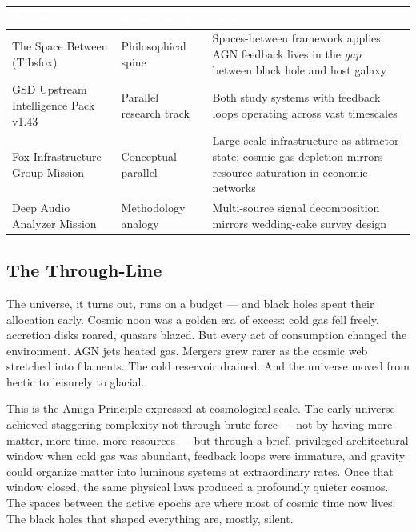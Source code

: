 \documentclass[11pt,letterpaper]{article}
\newcommand{\stageheader}[2]{%
  \noindent\colorbox{#2}{\makebox[\textwidth][l]{%
    \textcolor{white}{\bfseries\sffamily\hspace{6pt}#1\hspace{6pt}}}}%
  \vspace{0.5em}\par%
}
\newcommand{\tableheader}[1]{\textbf{\sffamily\textcolor{white}{#1}}}
\begin{document}
\begin{center}
\begin{tabularx}{\textwidth}{L{4cm}L{4cm}X}
\toprule
{}
\tableheader{Document} & \tableheader{Relationship} & \tableheader{Notes} \\
\midrule
The Space Between (Tibsfox) & Philosophical spine & Spaces-between framework applies: AGN feedback lives in the \emph{gap} between black hole and host galaxy \\
GSD Upstream Intelligence Pack v1.43 & Parallel research track & Both study systems with feedback loops operating across vast timescales \\
Fox Infrastructure Group Mission & Conceptual parallel & Large-scale infrastructure as attractor-state: cosmic gas depletion mirrors resource saturation in economic networks \\
Deep Audio Analyzer Mission & Methodology analogy & Multi-source signal decomposition mirrors wedding-cake survey design \\
\bottomrule
\end{tabularx}
\end{center}

\subsection{The Through-Line}

The universe, it turns out, runs on a budget --- and black holes spent their allocation early. Cosmic noon was a golden era of excess: cold gas fell freely, accretion disks roared, quasars blazed. But every act of consumption changed the environment. AGN jets heated gas. Mergers grew rarer as the cosmic web stretched into filaments. The cold reservoir drained. And the universe moved from hectic to leisurely to glacial.

This is the Amiga Principle expressed at cosmological scale. The early universe achieved staggering complexity not through brute force --- not by having more matter, more time, more resources --- but through a brief, privileged architectural window when cold gas was abundant, feedback loops were immature, and gravity could organize matter into luminous systems at extraordinary rates. Once that window closed, the same physical laws produced a profoundly quieter cosmos. The spaces between the active epochs are where most of cosmic time now lives. The black holes that shaped everything are, mostly, silent.

\newpage
\stageheader{STAGE 2 --- RESEARCH REFERENCE}{secondary}
\end{document}
